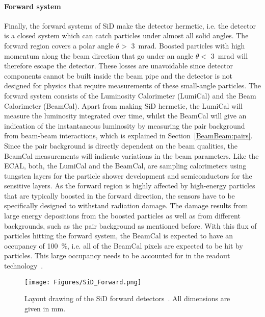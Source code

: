 \paragraph{Forward system}
Finally, the forward systems of SiD make the detector hermetic, i.e. the detector is a closed system which can catch particles under almost all solid angles.
The forward region covers a polar angle $\theta > $ \SI{3}{\milli\radian}.
Boosted particles with high momentum along the beam direction that go under an angle $\theta < $ \SI{3}{\milli\radian} will therefore escape the detector.
These losses are unavoidable since detector components cannot be built inside the beam pipe and the detector is not designed for physics that require measurements of these small-angle particles.
The forward system consists of the Luminosity Calorimeter (LumiCal) and the Beam Calorimeter (BeamCal).
Apart from making SiD hermetic, the LumiCal will measure the luminosity integrated over time, whilst the BeamCal will give an indication of the instantaneous luminosity by measuring the \positron \electron pair background from beam-beam interactions, which is explained in Section~\ref{BeamBeam:pairs}.
Since the pair background is directly dependent on the beam qualities, the BeamCal measurements will indicate variations in the beam parameters.
Like the ECAL, both, the LumiCal and the BeamCal, are sampling calorimeters using tungsten layers for the particle shower development and semiconductors for the sensitive layers.
As the forward region is highly affected by high-energy particles that are typically boosted in the forward direction, the sensors have to be specifically designed to withstand radiation damage.
The damage results from large energy depositions from the boosted particles as well as from different backgrounds, such as the pair background as mentioned before.
With this flux of particles hitting the forward system, the BeamCal is expected to have an occupancy of \SI{100}{\percent}, i.e. all of the BeamCal pixels are expected to be hit by particles.
This large occupancy needs to be accounted for in the readout technology~\cite[p. 133ff]{TDR4}.
\begin{figure}[h!]
\centering
\texttt{[image: Figures/SiD\_Forward.png]}
\caption[Drawing of the SiD forward detectors]{Layout drawing of the SiD forward detectors~\cite[p. 134]{TDR4}.
All dimensions are given in mm.}
\label{fig:SiD_Forward}
\end{figure}

